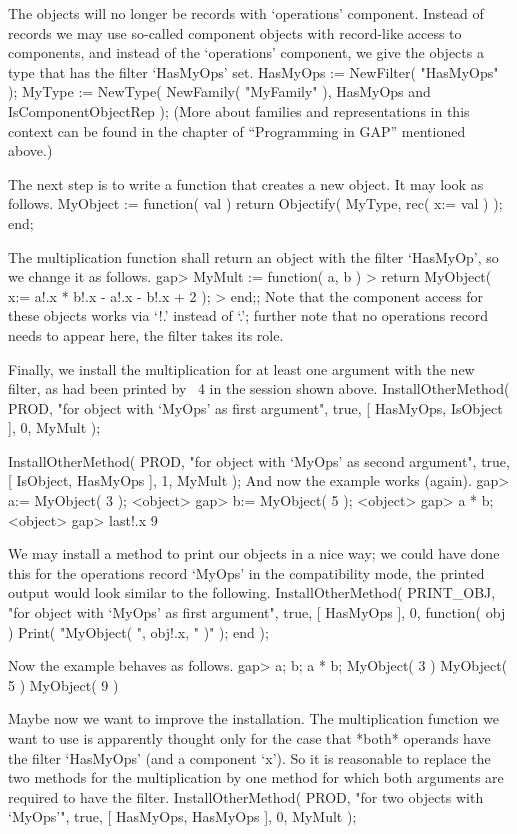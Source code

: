 The objects will no longer be records with `operations' component.
Instead of records we may use so-called component objects
with record-like access to components, 
and instead of the `operations' component, we give the objects a
type that has the filter `HasMyOps' set.
\begintt
HasMyOps := NewFilter( "HasMyOps" );
MyType := NewType( NewFamily( "MyFamily" ),
                   HasMyOps and IsComponentObjectRep );
\endtt
(More about families and representations in this context can be found
in the chapter of ``Programming in GAP'' mentioned above.)

The next step is to write a function that creates a new object.
It may look as follows.
\begintt
MyObject := function( val )
    return Objectify( MyType, rec( x:= val ) );
end;
\endtt

The multiplication function shall return an object with the
filter `HasMyOp', so we change it as follows.
\begintt
gap> MyMult := function( a, b )                          
>        return MyObject( x:= a!.x * b!.x - a!.x - b!.x + 2 );
>    end;; 
\endtt
Note that the component access for these objects
works via `!.' instead of `.';
further note that no operations record needs to appear here,
the filter takes its role.

Finally, we install the multiplication for at least one argument
with the new filter, as had been printed by {\GAP}~4 in the
session shown above.
\begintt
InstallOtherMethod( PROD,
    "for object with `MyOps' as first argument",
    true,
    [ HasMyOps, IsObject ], 0,
    MyMult );

InstallOtherMethod( PROD,
    "for object with `MyOps' as second argument",
    true,
    [ IsObject, HasMyOps ], 1,
    MyMult );
\endtt
And now the example works (again).
\begintt
gap> a:= MyObject( 3 );
<object>
gap> b:= MyObject( 5 );
<object>
gap> a * b;
<object>
gap> last!.x
9
\endtt

We may install a method to print our objects in a nice way;
we could have done this for the operations record `MyOps'
in the compatibility mode,
the printed output would look similar to the following.
\begintt
InstallOtherMethod( PRINT_OBJ,
    "for object with `MyOps' as first argument",
    true,
    [ HasMyOps ], 0,
    function( obj ) Print( "MyObject( ", obj!.x, " )" ); end );
\endtt

Now the example behaves as follows.
\begintt
gap> a;  b;  a * b;
MyObject( 3 )
MyObject( 5 )
MyObject( 9 )
\endtt

Maybe now we want to improve the installation.
The multiplication function we want to use is apparently
thought only for the case that *both* operands have
the filter `HasMyOps' (and a component `x').
So it is reasonable to replace the two methods for
the multiplication by one method for which both arguments
are required to have the filter.
\begintt
InstallOtherMethod( PROD,
    "for two objects with `MyOps'",
    true,
    [ HasMyOps, HasMyOps ], 0,
    MyMult );
\endtt

